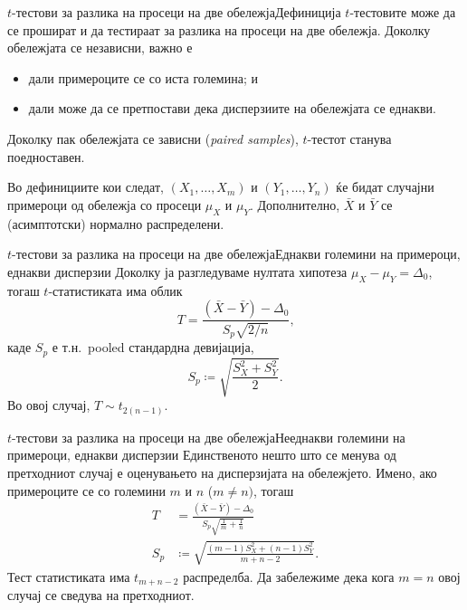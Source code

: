\documentclass[hyperref={unicode}, xcolor={svgnames, table},
usepdftitle=false]{beamer}
\theoremstyle{remark}
\begin{document}
\begin{frame}{\(t\)-тестови за разлика на просеци на две обележја}{Дефиниција}
  \(t\)-тестовите може да се прошират и да тестираат за разлика на просеци на
  две обележја.  Доколку обележјата се независни, важно е
  \begin{itemize}
  \item дали примероците се со иста големина; и
  \item дали може да се претпостави дека дисперзиите на обележјата се еднакви.
  \end{itemize}

  Доколку пак обележјата се зависни (\emph{paired samples}), \(t\)-тестот
  станува поедноставен.

  Во дефинициите кои следат, \((X_1, \ldots, X_m)\) и \((Y_1, \ldots, Y_n)\) ќе
  бидат случајни примероци од обележја со просеци \(\mu_X\) и \(\mu_Y\).
  Дополнително, \(\bar{X}\) и \(\bar{Y}\) се (асимптотски) нормално
  распределени.
\end{frame}

\begin{frame}{\(t\)-тестови за разлика на просеци на две обележја}{Еднакви
    големини на примероци, еднакви дисперзии}
  Доколку ја разгледуваме нултата хипотеза \(\mu_X - \mu_Y = \Delta_0\), тогаш
  \(t\)-статистиката има облик
  \[
    T = \frac{(\bar{X} - \bar{Y}) - \Delta_0}{S_p \sqrt{2 / {n}}}\text{,}
  \]
  каде \(S_p\) е т.н.\ pooled стандардна девијација,
  \[
    S_p \coloneqq \sqrt{\frac{S_X^2 + S_Y^2}{2}}\text{.}
  \]
  Во овој случај, \(T \sim t_{2 (n - 1)}\).
\end{frame}

\begin{frame}{\(t\)-тестови за разлика на просеци на две
    обележја}{Нееднакви големини на примероци, еднакви дисперзии}
  Единственото нешто што се менува од претходниот случај е оценувањето на
  дисперзијата на обележјето.  Имено, ако примероците се со големини \(m\) и
  \(n\) (\(m \ne n)\), тогаш
  \begin{align*}
    T &= \frac{(\bar{X} - \bar{Y}) - \Delta_0}{S_p \sqrt{\frac{1}{m} +
        \frac{1}{n}}} \\
    S_p &\coloneqq \sqrt{\frac{(m - 1) S_X^2 + (n - 1) S_Y^2}{m + n - 2}}\text{.}
  \end{align*}
  Тест статистиката има \(t_{m + n - 2}\) распределба.  Да забележиме дека кога
  \(m = n\) овој случај се сведува на претходниот.
\end{frame}
\end{document}
